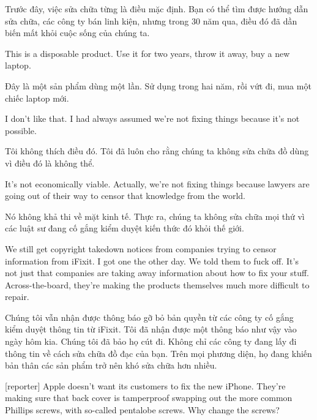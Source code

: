 \documentclass[a4paper]{article}
\begin{document}
	\begin{vietnamese-v2}
		[Kyle] Trước đây, việc sửa chữa từng là điều mặc định. Bạn có thể tìm được hướng dẫn sửa chữa, các công ty bán linh kiện, nhưng trong 30 năm qua, điều đó đã dần biến mất khỏi cuộc sống của chúng ta.
	\end{vietnamese-v2}
	
	This is a disposable product.
	Use it for two years, throw it away, buy a new laptop.
	
	\begin{vietnamese-v2}
		Đây là một sản phẩm dùng một lần.
		Sử dụng trong hai năm, rồi vứt đi, mua một chiếc laptop mới.
	\end{vietnamese-v2}
	
	I don't like that.
	I had always assumed we're not fixing things because it's not possible.
	
	\begin{vietnamese-v2}
		Tôi không thích điều đó. Tôi đã luôn cho rằng chúng ta không sửa chữa đồ dùng vì điều đó là không thể.
	\end{vietnamese-v2}
	
	It's not economically viable.
	Actually, we're not fixing things because lawyers are going out of their way to censor that knowledge from the world.
	
	\begin{vietnamese-v2}
		Nó không khả thi về mặt kinh tế.
		Thực ra, chúng ta không sửa chữa mọi thứ vì các luật sư đang cố gắng kiểm duyệt kiến thức đó khỏi thế giới.
	\end{vietnamese-v2}
	
	We still get copyright takedown notices from companies trying to censor information from iFixit.
	I got one the other day.
	We told them to fuck off.
	It's not just that companies are taking away information about how to fix your stuff.
	Across-the-board, they're making the products themselves much more difficult to repair.
	
	\begin{vietnamese-v2}
		Chúng tôi vẫn nhận được thông báo gỡ bỏ bản quyền từ các công ty cố gắng kiểm duyệt thông tin từ iFixit.
		Tôi đã nhận được một thông báo như vậy vào ngày hôm kia.
		Chúng tôi đã bảo họ cút đi.
		Không chỉ các công ty đang lấy đi thông tin về cách sửa chữa đồ đạc của bạn.
		Trên mọi phương diện, họ đang khiến bản thân các sản phẩm trở nên khó sửa chữa hơn nhiều.
	\end{vietnamese-v2}
	
	[reporter] Apple doesn't want its customers to fix the new iPhone.
	They're making sure that back cover is tamperproof swapping out the more common Phillips screws, with so-called pentalobe screws.
	Why change the screws?
	
\end{document}
